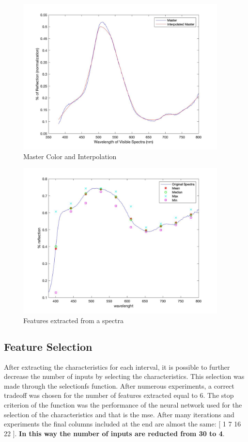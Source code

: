 \documentclass{article}
\begin{document}
\begin{figure}[!h]
\center
  \includegraphics[width=300pt]{img/interpolation.jpg}
  \caption{Master Color and Interpolation}
  \label{fig:interpolation}
\end{figure}

\begin{figure}[!h]
\center
  \includegraphics[width=300pt]{img/features.jpg}
  \caption{Features extracted from a spectra}
  \label{fig:features}
\end{figure}

\subsection{Feature Selection} 
After extracting the characteristics for each interval, it is possible to further decrease the number of inputs by selecting the characteristics. This selection was made through the selectionfs function. After numerous experiments, a correct tradeoff was chosen for the number of features extracted equal to 6. The stop criterion of the function was the performance of the neural network used for the selection of the characteristics and that is the mse. After many iterations and experiments the final columns included at the end are almost the same:  [ 1 7 16 22 ]. \textbf{In this way the number of inputs are reducted from 30 to 4}. 
 
\end{document}
